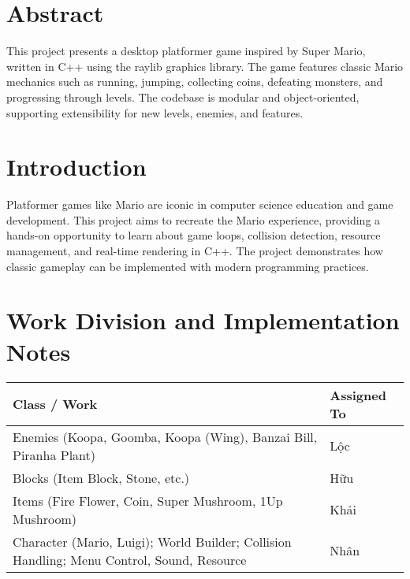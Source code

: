 
\clearpage
\begin{flushleft}
\section*{Abstract}
This project presents a desktop platformer game inspired by Super Mario, written in C++ using the raylib graphics library. The game features classic Mario mechanics such as running, jumping, collecting coins, defeating monsters, and progressing through levels. The codebase is modular and object-oriented, supporting extensibility for new levels, enemies, and features.

\section{Introduction}
Platformer games like Mario are iconic in computer science education and game development. This project aims to recreate the Mario experience, providing a hands-on opportunity to learn about game loops, collision detection, resource management, and real-time rendering in C++. The project demonstrates how classic gameplay can be implemented with modern programming practices.

\section{Work Division and Implementation Notes}
\begin{tabular}{ll}
\toprule
Class / Work & Assigned To \\
\midrule
Enemies (Koopa, Goomba, Koopa (Wing), Banzai Bill, Piranha Plant) & Lộc \\
\midrule
Blocks (Item Block, Stone, etc.) & Hữu \\
\midrule
Items (Fire Flower, Coin, Super Mushroom, 1Up Mushroom) & Khải \\
\midrule
Character (Mario, Luigi); World Builder; Collision Handling; Menu Control, Sound, Resource & Nhân \\
\bottomrule
\end{tabular}




\end{flushleft}
